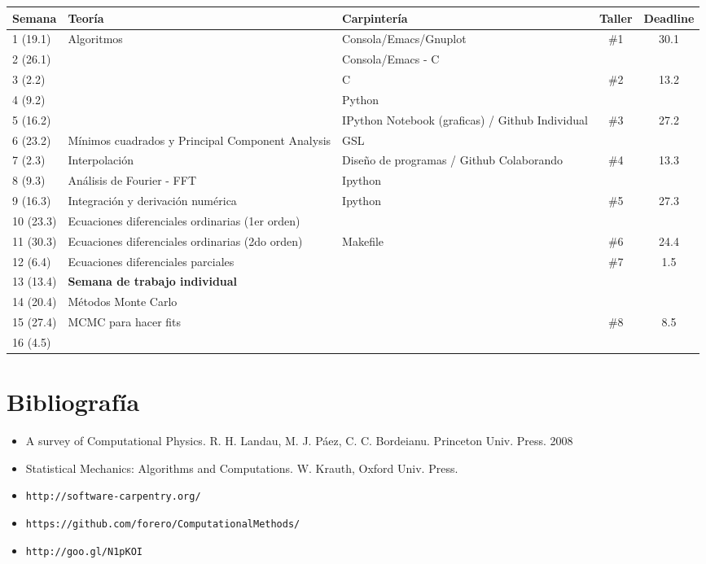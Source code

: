 \documentclass[11pt]{article}
\begin{document}
\begin{center}
\begin{tabular}{|p{1.8cm}|p{6cm}|p{5cm}|c|c|}
\hline
Semana & Teor\'ia & Carpinter\'ia & Taller & Deadline \\\hline
1 (19.1) & Algoritmos	&Consola/Emacs/Gnuplot & \#1 & 30.1\\\hline
2 (26.1)& 	& Consola/Emacs - C  & &\\\hline
3 (2.2)& 	&C  & \#2   & 13.2\\\hline
4 (9.2)& 	&Python &  &\\\hline
5 (16.2)& 	&IPython Notebook (graficas) / Github Individual & \#3 & 27.2\\\hline
6 (23.2)&      M\'inimos cuadrados y Principal Component Analysis & GSL & &\\\hline
7 (2.3)&  Interpolaci\'on & Dise\~no de programas / Github Colaborando & \#4 & 13.3\\ \hline
8 (9.3)& An\'alisis de Fourier - FFT &  Ipython & & \\\hline
9 (16.3) & Integraci\'on y derivaci\'on num\'erica & Ipython & \#5 &27.3\\\hline
10 (23.3) & Ecuaciones diferenciales ordinarias (1er orden)& & &  \\\hline
11 (30.3)& Ecuaciones diferenciales ordinarias (2do orden)&  Makefile &  \#6 & 24.4\\\hline 
12 (6.4) & Ecuaciones diferenciales parciales & & \#7 & 1.5\\\hline
13 (13.4) & {\bf Semana de trabajo individual} & & &\\\hline 
14 (20.4) & M\'etodos Monte Carlo &   &  & \\\hline
15 (27.4) & MCMC para hacer fits &    & \#8 & 8.5\\\hline
16 (4.5) &  &    &  & \\\hline
\hline
\end{tabular}
\end{center}


\section*{Bibliograf\'ia}
\begin{itemize}
\item
A survey of Computational Physics. R. H. Landau, M. J. P\'aez, C. C.
Bordeianu. Princeton Univ. Press. 2008 
\item
Statistical Mechanics: Algorithms and Computations. W. Krauth, Oxford Univ. Press. 
\item\verb"http://software-carpentry.org/"
\item\verb"https://github.com/forero/ComputationalMethods/"
\item\verb"http://goo.gl/N1pKOI"
\end{itemize}

 
\end{document}
